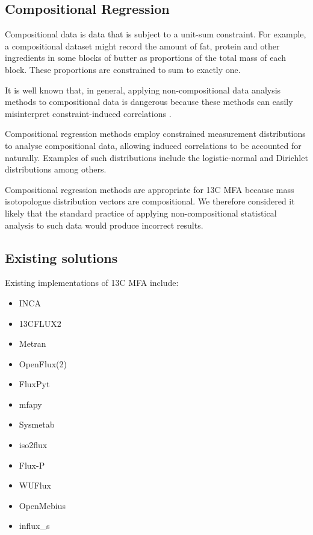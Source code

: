 \documentclass{article}
\def\tightlist{}
\begin{document}
\subsection{Compositional Regression}\label{compositional-regression}

Compositional data is data that is subject to a unit-sum constraint. For
example, a compositional dataset might record the amount of fat, protein
and other ingredients in some blocks of butter as proportions of the
total mass of each block. These proportions are constrained to sum to
exactly one.

It is well known that, in general, applying non-compositional data
analysis methods to compositional data is dangerous because these
methods can easily misinterpret constraint-induced correlations
\citep[Ch. 3]{aitchisonjStatisticalAnalysisCompositional}.

Compositional regression methods employ constrained measurement
distributions to analyse compositional data, allowing induced
correlations to be accounted for naturally. Examples of such
distributions include the logistic-normal and Dirichlet distributions
\citep[Ch. 3]{aitchisonjStatisticalAnalysisCompositional} among others.

Compositional regression methods are appropriate for 13C MFA because
mass isotopologue distribution vectors are compositional. We therefore
considered it likely that the standard practice of applying
non-compositional statistical analysis to such data would produce
incorrect results.

\subsection{Existing solutions}\label{existing-solutions}

Existing implementations of 13C MFA include:

\begin{itemize}
\tightlist
\item
  INCA
\item
  13CFLUX2
\item
  Metran
\item
  OpenFlux(2)
\item
  FluxPyt
\item
  mfapy
\item
  Sysmetab
\item
  iso2flux
\item
  Flux-P
\item
  WUFlux
\item
  OpenMebius
\item
  influx\_s
\end{itemize}
\end{document}
